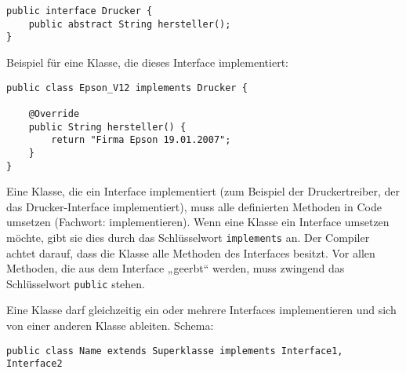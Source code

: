 \begin{lstlisting}
public interface Drucker {
    public abstract String hersteller();
}
\end{lstlisting}
   
Beispiel für eine Klasse, die dieses Interface implementiert:

\begin{lstlisting}
public class Epson_V12 implements Drucker {

    @Override
    public String hersteller() {
        return "Firma Epson 19.01.2007";
    }
}
\end{lstlisting}

Eine Klasse, die ein Interface implementiert (zum Beispiel der Druckertreiber,
der das Drucker-Interface implementiert), muss alle definierten Methoden in Code
umsetzen (Fachwort: implementieren). Wenn eine Klasse ein Interface umsetzen
möchte, gibt sie dies durch das Schlüsselwort \lstinline|implements| an. Der
Compiler achtet darauf, dass die Klasse alle Methoden des Interfaces besitzt.
Vor allen Methoden, die aus dem Interface „geerbt“ werden, muss zwingend das
Schlüsselwort \lstinline|public| stehen.

Eine Klasse darf gleichzeitig ein oder mehrere Interfaces implementieren und
sich von einer anderen Klasse ableiten. Schema:

\begin{lstlisting}
public class Name extends Superklasse implements Interface1, Interface2
\end{lstlisting}
